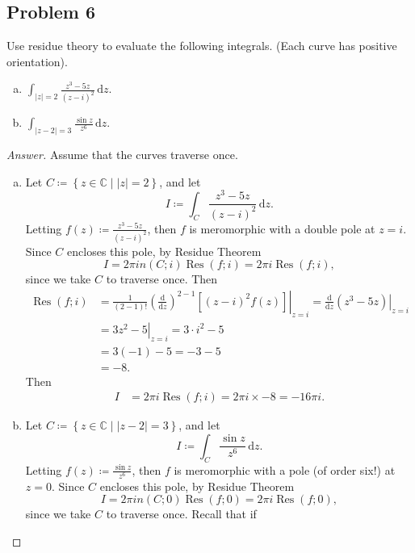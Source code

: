\documentclass[12pt]{article}
\newcommand{\cx}{\mathbb{C}}
\newcommand\paren[1]{\left( #1 \right)}
\newcommand\setb[1]{\left \{ #1 \right \}}
\newcommand{\sqbrack}[1]{\left [ #1 \right ]}
\newcommand{\ds}{\displaystyle}
\theoremstyle{definition}
\DeclareMathOperator\Res{Res}
\begin{document}
\subsection{Problem 6}
Use residue theory to evaluate the following integrals. (Each curve has positive orientation).
\begin{enumerate}[(a)]
    \item $\ds \int_{|z| = 2} \frac{z^3 - 5z}{(z-i)^2} \, \mathrm{d}z$.
    \item $\ds \int_{|z-2| = 3} \frac{\sin z}{z^6} \, \mathrm{d}z$.
\end{enumerate}
\begin{proof}[Answer]
    Assume that the curves traverse once. 
    \begin{enumerate}[(a)]
        \item Let $C \coloneqq \setb{ z \in \cx \mid |z| = 2 }$, and let 
        \[
            I \coloneqq \int_C \frac{z^3 - 5z}{(z-i)^2} \, \mathrm{d}z.
        \]
        Letting $f(z) \coloneqq \frac{z^3 - 5z}{(z-i)^2}$, then $f$ is meromorphic with a double pole at $z = i$. Since $C$ encloses this pole, by Residue Theorem
        \[
            I = 2\pi i n(C;i) \Res(f;i) = 2\pi i \Res(f;i),
        \]
        since we take $C$ to traverse once. Then 
        \begin{align*}
            \Res(f;i) & = \left. \frac{1}{(2-1)!} \paren{ \frac{\mathrm{d}}{\mathrm{d}z} }^{2-1} \sqbrack{ (z-i)^2 f(z) } \right|_{z = i} = \left. \frac{\mathrm{d}}{\mathrm{d}z} \paren{ z^3 - 5z } \right|_{z = i} \\
            & = \left. 3z^2 - 5 \right|_{z = i} = 3\cdot i^2 - 5 \\
            & = 3(-1) - 5 = -3 - 5 \\
            & = -8.
        \end{align*}
        Then 
        \begin{align*}
            I & = 2\pi i \Res(f;i) = 2\pi i \times -8 = \boxed{ -16 \pi i . }
        \end{align*}
        \item Let $C \coloneqq \setb{ z \in \cx \mid |z-2| = 3 }$, and let
        \[
            I \coloneqq \int_C \frac{\sin z}{z^6} \, \mathrm{d}z.
        \]
        Letting $f(z) \coloneqq \frac{\sin z}{z^6}$, then $f$ is meromorphic with a pole (of order six!) at $z = 0$. Since $C$ encloses this pole, by Residue Theorem
        \[
            I  = 2\pi i n(C;0) \Res(f;0) = 2\pi i \Res(f;0),
        \]
        since we take $C$ to traverse once. Recall that if

\end{enumerate}
\end{proof}
\end{document}
